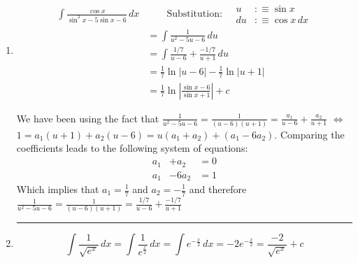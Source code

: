 \begin{enumerate}
  \item
    \begin{equation}
      \begin{aligned}
        \int \frac{\cos x}{\sin^2 x - 5 \sin x - 6} \, dx
        & \qquad
        \text{Substitution:}
        \quad
        \boxed{\begin{aligned}
            u &:\equiv \sin x \\
            du &: \equiv \cos x \, dx
          \end{aligned}
        } \\
        & = \int \frac{1}{u^2-5u-6} \, du \\
        & = \int \frac{1/7}{u-6}+\frac{-1/7}{u+1} \, du \\
        & = \frac{1}{7} \ln |u-6| - \frac{1}{7} \ln |u+1| \\
        & = \frac{1}{7} \ln \left | \frac{ \sin x - 6} {\sin x + 1} \right | + c
      \end{aligned}
    \end{equation}

    We have been using the fact that $\frac{1}{u^2-5u-6}=\frac{1}{(u-6)(u+1)}=\frac{a_1}{u-6}+\frac{a_2}{u+1}$ $\iff$ $1=a_1 (u+1) + a_2(u-6)=u(a_1+a_2)+(a_1-6a_2)$. Comparing the coefficients leads to the following system of equations:
    \begin{equation}
      \begin{aligned}
        a_1 & +   a_2 & = 0 \\
        a_1 & - 6 a_2 & = 1
      \end{aligned}
    \end{equation}
    Which implies that $a_1 = \frac{1}{7}$ and $a_2 = -\frac{1}{7}$ and therefore $\frac{1}{u^2-5u-6}=\frac{1}{(u-6)(u+1)}=\frac{1/7}{u-6}+\frac{-1/7}{u+1}$
    \bigbreak
    \hrule
    \bigbreak

  \item
    \begin{equation}
        \int \frac{1}{\sqrt{e^x}} \,dx
         = \int \frac{1}{e^{\frac{x}{2}}} \, dx
         = \int e^{-\frac{x}{2}} \, dx
         = -2 e^{-\frac{x}{2}} = \frac{-2}{\sqrt{e^x}}+c
    \end{equation}

\end{enumerate}